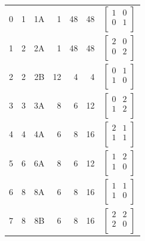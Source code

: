 \begin{center}
\begin{tabular}{*{7}{r}}
0 & 1 & 1A & 1 & 48 & 48 & $\left[
\begin{array}{*{2}{r}}
1 & 0\\
0 & 1\\
\end{array}
\right]
$\\
1 & 2 & 2A & 1 & 48 & 48 & $\left[
\begin{array}{*{2}{r}}
2 & 0\\
0 & 2\\
\end{array}
\right]
$\\
2 & 2 & 2B & 12 & 4 & 4 & $\left[
\begin{array}{*{2}{r}}
0 & 1\\
1 & 0\\
\end{array}
\right]
$\\
3 & 3 & 3A & 8 & 6 & 12 & $\left[
\begin{array}{*{2}{r}}
0 & 2\\
1 & 2\\
\end{array}
\right]
$\\
4 & 4 & 4A & 6 & 8 & 16 & $\left[
\begin{array}{*{2}{r}}
2 & 1\\
1 & 1\\
\end{array}
\right]
$\\
5 & 6 & 6A & 8 & 6 & 12 & $\left[
\begin{array}{*{2}{r}}
1 & 2\\
1 & 0\\
\end{array}
\right]
$\\
6 & 8 & 8A & 6 & 8 & 16 & $\left[
\begin{array}{*{2}{r}}
1 & 1\\
1 & 0\\
\end{array}
\right]
$\\
7 & 8 & 8B & 6 & 8 & 16 & $\left[
\begin{array}{*{2}{r}}
2 & 2\\
2 & 0\\
\end{array}
\right]
$\\
\end{tabular}
\end{center}
